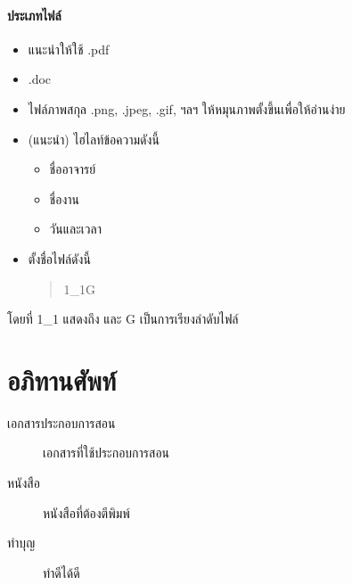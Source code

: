 \documentclass[a4paper,12pt,english]{sphinxmanual}
\begin{document}
\subsubsection{ประเภทไฟล์}
\label{\detokenize{submission_part2:id5}}\begin{itemize}
\item {} 
แนะนำให้ใช้ .pdf

\item {} 
.doc

\item {} 
ไฟล์ภาพสกุล .png, .jpeg, .gif, ฯลฯ ให้หมุนภาพตั้งขึ้นเพื่อให้อ่านง่าย

\item {} 
(แนะนำ) ไฮไลท์ข้อความดังนี้
\begin{itemize}
\item {} 
ชื่ออาจารย์

\item {} 
ชื่องาน

\item {} 
วันและเวลา

\end{itemize}

\item {} 
ตั้งชื่อไฟล์ดังนี้
\begin{quote}

1\_1G
\end{quote}

\end{itemize}

โดยที่ 1\_1 แสดงถึง และ G เป็นการเรียงลำดับไฟล์


\chapter{อภิทานศัพท์}
\label{\detokenize{glossary:id1}}\label{\detokenize{glossary::doc}}\begin{description}
\item[{เอกสารประกอบการสอน\label{\detokenize{glossary:term-0}}}] \leavevmode
เอกสารที่ใช้ประกอบการสอน

\item[{หนังสือ\label{\detokenize{glossary:term-1}}}] \leavevmode
หนังสือที่ต้องตีพิมพ์

\item[{ทำบุญ\label{\detokenize{glossary:term-2}}}] \leavevmode
ทำดีได้ดี

\end{description}
\end{document}
